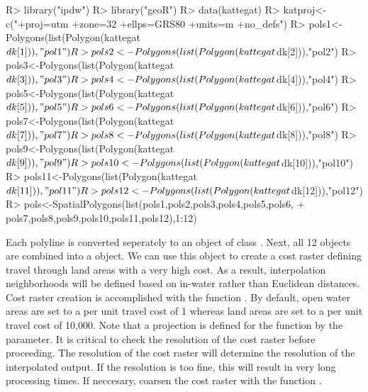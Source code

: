 \documentclass[nojss,shortnames]{jss}
\begin{document}
\begin{Schunk}
\begin{Sinput}
R> library("ipdw")
R> library("geoR")
R> data(kattegat)
R> katproj<-c("+proj=utm +zone=32 +ellps=GRS80 +units=m +no_defs")
R> pols1<-Polygons(list(Polygon(kattegat$dk[1])),"pol1")
R> pols2<-Polygons(list(Polygon(kattegat$dk[2])),"pol2")
R> pols3<-Polygons(list(Polygon(kattegat$dk[3])),"pol3")
R> pols4<-Polygons(list(Polygon(kattegat$dk[4])),"pol4")
R> pols5<-Polygons(list(Polygon(kattegat$dk[5])),"pol5")
R> pols6<-Polygons(list(Polygon(kattegat$dk[6])),"pol6")
R> pols7<-Polygons(list(Polygon(kattegat$dk[7])),"pol7")
R> pols8<-Polygons(list(Polygon(kattegat$dk[8])),"pol8")
R> pols9<-Polygons(list(Polygon(kattegat$dk[9])),"pol9")
R> pols10<-Polygons(list(Polygon(kattegat$dk[10])),"pol10")
R> pols11<-Polygons(list(Polygon(kattegat$dk[11])),"pol11")
R> pols12<-Polygons(list(Polygon(kattegat$dk[12])),"pol12")
R> pols<-SpatialPolygons(list(pols1,pols2,pols3,pols4,pols5,pols6,
+                           pols7,pols8,pols9,pols10,pols11,pols12),1:12)
\end{Sinput}
\end{Schunk}

 
Each polyline is converted seperately to an object of class . Next, all 12 objects are combined into a  object. We can use this  object to create a cost raster defining travel through land areas with a very high cost. As a result, interpolation neighborhoods will be defined based on in-water rather than Euclidean distances. Cost raster creation is accomplished with the  function . By default, open water areas are set to a per unit travel cost of 1 whereas land areas are set to a per unit travel cost of 10,000. Note that a projection is defined for the  function by the  parameter. It is critical to check the resolution of the cost raster before proceeding. The resolution of the cost raster will determine the resolution of the interpolated output. If the resolution is too fine, this will result in very long processing times. If neccesary, coarsen the cost raster with the  function . 

\begin{Schunk}
\end{Schunk}
\end{document}
